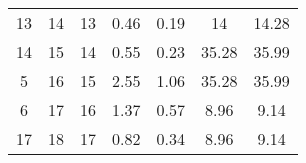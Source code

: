 \begin{table}[]
\begin{tabular}{@{}ccccccc@{}}
13                                                           & 14                                                             & 13                                                    & 0.46                                                                           & 0.19                                                                           & 14                                                                                  & 14.28                                                                                 \\
14                                                           & 15                                                             & 14                                                    & 0.55                                                                           & 0.23                                                                           & 35.28                                                                               & 35.99                                                                                 \\
5                                                            & 16                                                             & 15                                                    & 2.55                                                                           & 1.06                                                                           & 35.28                                                                               & 35.99                                                                                 \\
6                                                            & 17                                                             & 16                                                    & 1.37                                                                           & 0.57                                                                           & 8.96                                                                                & 9.14                                                                                  \\
17                                                           & 18                                                             & 17                                                    & 0.82                                                                           & 0.34                                                                           & 8.96                                                                                & 9.14                                                                                  \\

\end{tabular}
\end{table}
